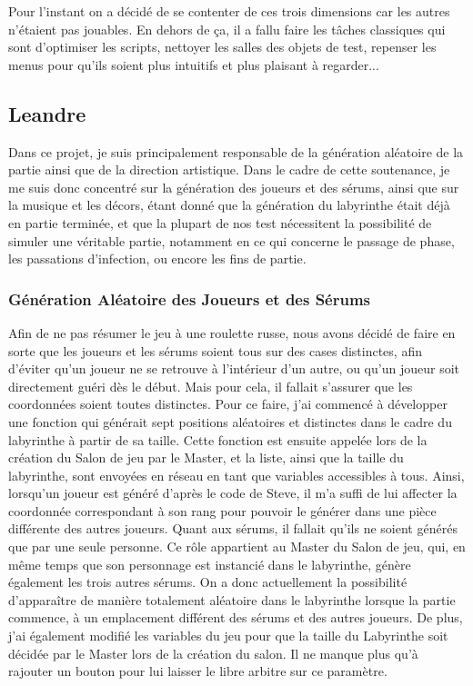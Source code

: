\documentclass{article}
\begin{document}
Pour l'instant on a décidé de se contenter de ces trois dimensions car les autres n'étaient pas jouables. En dehors de ça, il a fallu faire les tâches classiques qui sont d'optimiser les scripts, nettoyer les salles des objets de test, repenser les menus pour qu'ils soient plus intuitifs et plus plaisant à regarder...

\newpage
\subsection{Leandre}

Dans ce projet, je suis principalement responsable de la génération aléatoire de la partie ainsi que de la direction artistique. Dans le cadre de cette soutenance, je me suis donc concentré sur la génération des joueurs et des sérums, ainsi que sur la musique et les décors, étant donné que la génération du labyrinthe était déjà en partie terminée, et que la plupart de nos test nécessitent la possibilité de simuler une véritable partie, notamment en ce qui concerne le passage de phase, les passations d'infection, ou encore les fins de partie.

\subsubsection{Génération Aléatoire des Joueurs et des Sérums}


Afin de ne pas résumer le jeu à une roulette russe, nous avons décidé de faire en sorte que les joueurs et les sérums soient tous sur des cases distinctes, afin d'éviter qu'un joueur ne se retrouve à l'intérieur d'un autre, ou qu'un joueur soit directement guéri dès le début. Mais pour cela, il fallait s'assurer que les coordonnées soient toutes distinctes. Pour ce faire, j'ai commencé à développer une fonction qui générait sept positions aléatoires et distinctes dans le cadre du labyrinthe à partir de sa taille. Cette fonction est ensuite appelée lors de la création du Salon de jeu par le Master, et la liste, ainsi que la taille du labyrinthe, sont envoyées en réseau en tant que variables accessibles à tous. Ainsi, lorsqu'un joueur est généré d'après le code de Steve, il m'a suffi de lui affecter la coordonnée correspondant à son rang pour pouvoir le générer dans une pièce différente des autres joueurs. Quant aux sérums, il fallait qu'ils ne soient générés que par une seule personne. Ce rôle appartient au Master du Salon de jeu, qui, en même temps que son personnage est instancié dans le labyrinthe, génère également les trois autres sérums. On a donc actuellement la possibilité d'apparaître de manière totalement aléatoire dans le labyrinthe lorsque la partie commence, à un emplacement différent des sérums et des autres joueurs. De plus, j'ai également modifié les variables du jeu pour que la taille du Labyrinthe soit décidée par le Master lors de la création du salon. Il ne manque plus qu'à rajouter un bouton pour lui laisser le libre arbitre sur ce paramètre.
\end{document}
